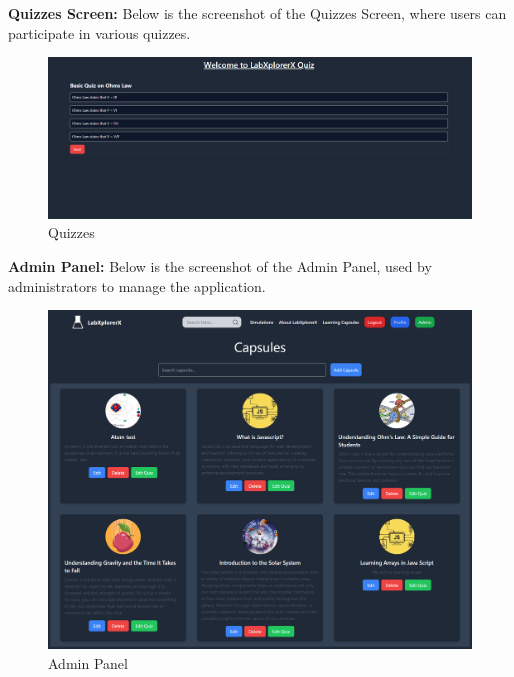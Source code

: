 \textbf{Quizzes Screen:} Below is the screenshot of the Quizzes Screen, where users can participate in various quizzes.
\begin{figure}[H]
    \centering
    \includegraphics[width = 16cm]{Diagrams/output/quiz.png}
    \caption{Quizzes}
\end{figure}
\newpage

\textbf{Admin Panel:} Below is the screenshot of the Admin Panel, used by administrators to manage the application.
\begin{figure}[H]
    \centering
    \includegraphics[width = 16cm]{Diagrams/output/admin.png}
    \caption{Admin Panel}
\end{figure}
\newpage

